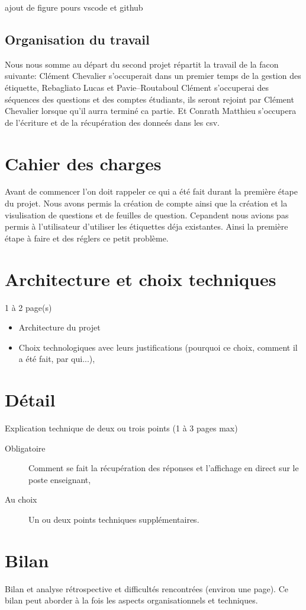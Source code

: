 \documentclass[a4paper, 12pt]{article}
\begin{document}
ajout de figure pours vscode et github
\subsection{Organisation du travail}
Nous nous somme au départ du second projet répartit la travail de la facon suivante: Clément Chevalier s'occuperait dans un premier temps de la gestion des étiquette, Rebagliato Lucas et Pavie--Routaboul Clément s'occuperai des séquences des questions et des comptes étudiants, ils seront rejoint par Clément Chevalier lorsque qu'il aurra terminé ca partie. Et Conrath Matthieu s'occupera de l'écriture et de la récupération des donneés dans les csv.
\section{Cahier des charges}

Avant de commencer l'on doit rappeler ce qui a été fait durant la première étape du projet. Nous avons permis la création de compte ainsi que la création et la visulisation de questions et de feuilles de question. Cepandent nous avions pas permis à l'utilisateur d'utiliser les étiquettes déja existantes. Ainsi la première étape à faire et des réglers ce petit problème.

\section{Architecture et choix techniques}

1 à 2 page(s) 
\begin{itemize}
\item Architecture du projet
\item Choix technologiques  avec leurs justifications (pourquoi ce choix, comment il a été fait, par qui...),
\end{itemize}

    
\section{Détail}

Explication technique de deux ou trois points (1 à 3 pages max)
\begin{description}
\item[Obligatoire] Comment se fait la récupération des réponses et l'affichage en direct sur le poste enseignant,
\item[Au choix] Un ou deux  points techniques supplémentaires.  
\end{description}

\section{Bilan}

Bilan et analyse rétrospective et difficultés rencontrées (environ une page). Ce bilan peut aborder à la fois les aspects organisationnels et techniques.

    
\end{document}
